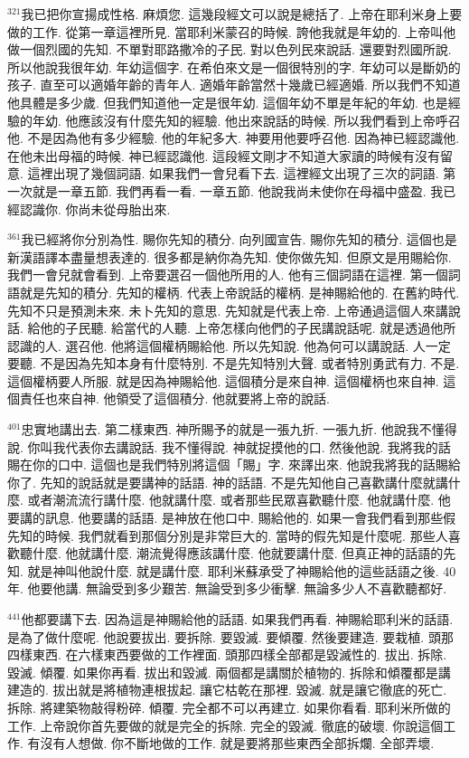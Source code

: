 \documentclass{book}
\begin{document}
$^{321}$我已把你宣揚成性格.
麻煩您.
這幾段經文可以說是總括了.
上帝在耶利米身上要做的工作.
從第一章這裡所見.
當耶利米蒙召的時候.
誇他我就是年幼的.
上帝叫他做一個烈國的先知.
不單對耶路撒冷的子民.
對以色列民來說話.
還要對烈國所說.
所以他說我很年幼.
年幼這個字.
在希伯來文是一個很特別的字.
年幼可以是斷奶的孩子.
直至可以適婚年齡的青年人.
適婚年齡當然十幾歲已經適婚.
所以我們不知道他具體是多少歲.
但我們知道他一定是很年幼.
這個年幼不單是年紀的年幼.
也是經驗的年幼.
他應該沒有什麼先知的經驗.
他出來說話的時候.
所以我們看到上帝呼召他.
不是因為他有多少經驗.
他的年紀多大.
神要用他要呼召他.
因為神已經認識他.
在他未出母福的時候.
神已經認識他.
這段經文剛才不知道大家讀的時候有沒有留意.
這裡出現了幾個詞語.
如果我們一會兒看下去.
這裡經文出現了三次的詞語.
第一次就是一章五節.
我們再看一看.
一章五節.
他說我尚未使你在母福中盛盈.
我已經認識你.
你尚未從母胎出來.

$^{361}$我已經將你分別為性.
賜你先知的積分.
向列國宣告.
賜你先知的積分.
這個也是新漢語譯本盡量想表達的.
很多都是納你為先知.
使你做先知.
但原文是用賜給你.
我們一會兒就會看到.
上帝要選召一個他所用的人.
他有三個詞語在這裡.
第一個詞語就是先知的積分.
先知的權柄.
代表上帝說話的權柄.
是神賜給他的.
在舊約時代.
先知不只是預測未來.
未卜先知的意思.
先知就是代表上帝.
上帝通過這個人來講說話.
給他的子民聽.
給當代的人聽.
上帝怎樣向他們的子民講說話呢.
就是透過他所認識的人.
選召他.
他將這個權柄賜給他.
所以先知說.
他為何可以講說話.
人一定要聽.
不是因為先知本身有什麼特別.
不是先知特別大聲.
或者特別勇武有力.
不是.
這個權柄要人所服.
就是因為神賜給他.
這個積分是來自神.
這個權柄也來自神.
這個責任也來自神.
他領受了這個積分.
他就要將上帝的說話.

$^{401}$忠實地講出去.
第二樣東西.
神所賜予的就是一張九折.
一張九折.
他說我不懂得說.
你叫我代表你去講說話.
我不懂得說.
神就捉摸他的口.
然後他說.
我將我的話賜在你的口中.
這個也是我們特別將這個「賜」字.
來譯出來.
他說我將我的話賜給你了.
先知的說話就是要講神的話語.
神的話語.
不是先知他自己喜歡講什麼就講什麼.
或者潮流流行講什麼.
他就講什麼.
或者那些民眾喜歡聽什麼.
他就講什麼.
他要講的訊息.
他要講的話語.
是神放在他口中.
賜給他的.
如果一會我們看到那些假先知的時候.
我們就看到那個分別是非常巨大的.
當時的假先知是什麼呢.
那些人喜歡聽什麼.
他就講什麼.
潮流覺得應該講什麼.
他就要講什麼.
但真正神的話語的先知.
就是神叫他說什麼.
就是講什麼.
耶利米蘇承受了神賜給他的這些話語之後.
40年.
他要他講.
無論受到多少艱苦.
無論受到多少衝擊.
無論多少人不喜歡聽都好.

$^{441}$他都要講下去.
因為這是神賜給他的話語.
如果我們再看.
神賜給耶利米的話語.
是為了做什麼呢.
他說要拔出.
要拆除.
要毀滅.
要傾覆.
然後要建造.
要栽植.
頭那四樣東西.
在六樣東西要做的工作裡面.
頭那四樣全部都是毀滅性的.
拔出.
拆除.
毀滅.
傾覆.
如果你再看.
拔出和毀滅.
兩個都是講關於植物的.
拆除和傾覆都是講建造的.
拔出就是將植物連根拔起.
讓它枯乾在那裡.
毀滅.
就是讓它徹底的死亡.
拆除.
將建築物敲得粉碎.
傾覆.
完全都不可以再建立.
如果你看看.
耶利米所做的工作.
上帝說你首先要做的就是完全的拆除.
完全的毀滅.
徹底的破壞.
你說這個工作.
有沒有人想做.
你不斷地做的工作.
就是要將那些東西全部拆爛.
全部弄壞.
\end{document}
